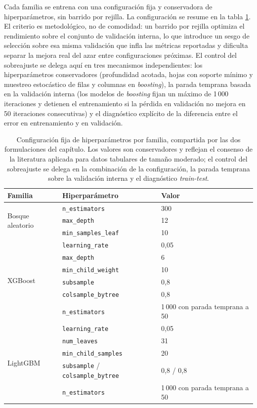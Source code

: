 Cada familia se entrena con una configuración fija y conservadora de hiperparámetros,
sin barrido por rejilla. La configuración se resume en la tabla
\ref{tab:o4-hyperparams}. El criterio es metodológico, no de comodidad: un barrido por
rejilla optimiza el rendimiento sobre el conjunto de validación interna, lo que
introduce un sesgo de selección sobre esa misma validación que infla las métricas
reportadas y dificulta separar la mejora real del azar entre configuraciones próximas.
El control del sobreajuste se delega aquí en tres mecanismos independientes: los
hiperparámetros conservadores (profundidad acotada, hojas con soporte mínimo y muestreo
estocástico de filas y columnas en \textit{boosting}), la parada temprana basada en la
validación interna (los modelos de \textit{boosting} fijan un máximo de 1\,000
iteraciones y detienen el entrenamiento si la pérdida en validación no mejora en 50
iteraciones consecutivas) y el diagnóstico explícito de la diferencia entre el error
en entrenamiento y en validación.

\begin{table}[H]
  \centering
  \small
  \begin{tabular}{lll}
    \toprule
    \textbf{Familia} & \textbf{Hiperparámetro} & \textbf{Valor} \\
    \midrule
    \multirow{3}{*}{Bosque aleatorio}
      & \texttt{n\_estimators}    & 300 \\
      & \texttt{max\_depth}       & 12 \\
      & \texttt{min\_samples\_leaf} & 10 \\
    \midrule
    \multirow{6}{*}{XGBoost}
      & \texttt{learning\_rate}   & 0,05 \\
      & \texttt{max\_depth}       & 6 \\
      & \texttt{min\_child\_weight} & 10 \\
      & \texttt{subsample}        & 0,8 \\
      & \texttt{colsample\_bytree} & 0,8 \\
      & \texttt{n\_estimators}    & 1\,000 con parada temprana a 50 \\
    \midrule
    \multirow{5}{*}{LightGBM}
      & \texttt{learning\_rate}   & 0,05 \\
      & \texttt{num\_leaves}      & 31 \\
      & \texttt{min\_child\_samples} & 20 \\
      & \texttt{subsample} / \texttt{colsample\_bytree} & 0,8 / 0,8 \\
      & \texttt{n\_estimators}    & 1\,000 con parada temprana a 50 \\
    \bottomrule
  \end{tabular}
  \caption[Configuración de hiperparámetros]{Configuración fija de hiperparámetros por
  familia, compartida por las dos formulaciones del capítulo. Los valores son
  conservadores y reflejan el consenso de la literatura aplicada para datos tabulares
  de tamaño moderado; el control del sobreajuste se delega en la combinación de la
  configuración, la parada temprana sobre la validación interna y el diagnóstico
  \textit{train-test}.}
  \label{tab:o4-hyperparams}
\end{table}

